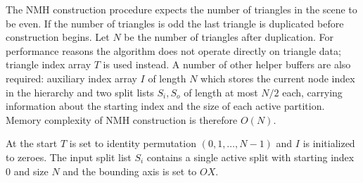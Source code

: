 The NMH construction procedure expects the number of triangles in the scene to be even. If the number of triangles is odd the last triangle is duplicated before construction begins. Let $N$ be the number of triangles after duplication. For performance reasons the algorithm does not operate directly on triangle data; triangle index array $T$ is used instead. A number of other helper buffers are also required: auxiliary index array $I$ of length $N$ which stores the current node index in the hierarchy and two split lists $S_{i}, S_{o}$ of length at most $N/2$ each, carrying information about the starting index and the size of each active partition. Memory complexity of NMH construction is therefore $O(N)$.

At the start $T$ is set to identity permutation $(0, 1, \dots, N-1)$ and $I$ is initialized to zeroes. The input split list $S_{i}$ contains a single active split with starting index $0$ and size $N$ and the bounding axis is set to $OX$.

